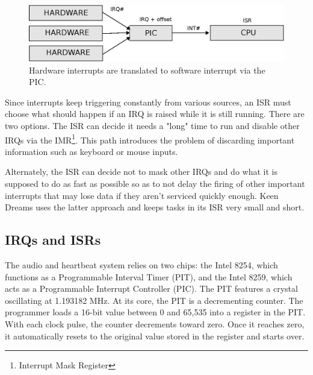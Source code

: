 \documentclass[book.tex]{subfiles}
\begin{document}
\par
\begin{figure}[H]
  \centering
  \includegraphics[width=\textwidth]{imgs/drawings/irqs/explanationsvg.eps}
  \caption{Hardware interrupts are translated to software interrupt via the PIC.}
\end{figure}

\par
 Since interrupts keep triggering constantly from various sources, an ISR must choose what should happen if an IRQ is raised while it is still running. There are two options.  The ISR can decide it needs a "long" time to run and disable other IRQs via the IMR\footnote{Interrupt Mask Register}. This path introduces the problem of discarding important information such as keyboard or mouse inputs.\\
 \par
 Alternately, the ISR can decide not to mask other IRQs and do what it is supposed to do as fast as possible so as to not delay the firing of other important interrupts that may lose data if they aren't serviced quickly enough. Keen Dreams uses the latter approach and keeps tasks in its ISR very small and short. 

\subsection{IRQs and ISRs}
The audio and heartbeat system relies on two chips: the Intel 8254, which functions as a Programmable Interval Timer (PIT), and the Intel 8259, which acts as a Programmable Interrupt Controller (PIC). The PIT features a crystal oscillating at 1.193182 MHz. At its core, the PIT is a decrementing counter. The programmer loads a 16-bit value between 0 and 65,535 into a register in the PIT. With each clock pulse, the counter decrements toward zero. Once it reaches zero, it automatically resets to the original value stored in the register and starts over.\\
\end{document}
